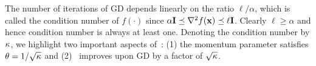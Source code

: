 The number of iterations of GD depends linearly on the ratio $\ell/\alpha$, which is called the condition number of $f(\cdot)$ since $\alpha \mathbf{I} \preceq\nabla^2 f(\mathbf{x}) \preceq \ell \mathbf{I} $. Clearly $\ell \geq \alpha$ and hence condition number is always at least one. Denoting the condition number by ${\kappa}$, we highlight two important aspects of~\nag: (1) the momentum parameter satisfies $\theta = 1/\sqrt{\kappa}$ and (2) \nag~improves upon GD by a factor of $\sqrt{\kappa}$. 

